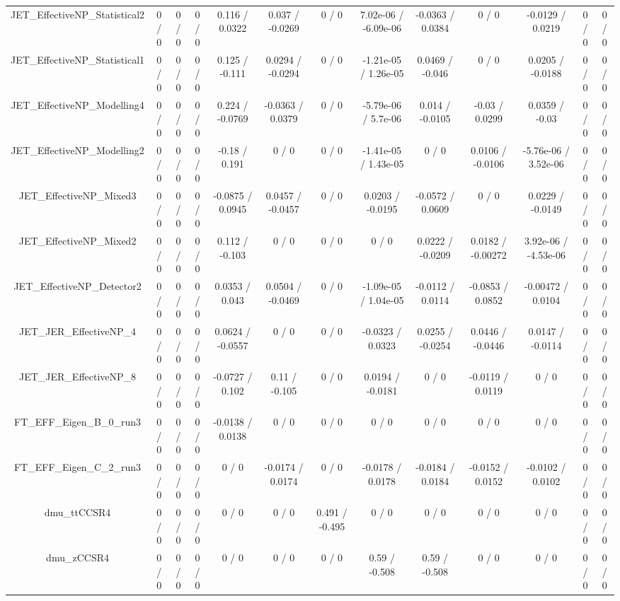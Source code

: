 \documentclass[10pt]{article}
\begin{document}
\begin{table}[htbp]
\begin{center}
\begin{tabular}{|c|c|c|c|c|c|c|c|c|c|c|c|c|}
  JET_EffectiveNP_Statistical2 & 0 / 0 & 0 / 0 & 0 / 0 & 0.116 / 0.0322 & 0.037 / -0.0269 & 0 / 0 & 7.02e-06 / -6.09e-06 & -0.0363 / 0.0384 & 0 / 0 & -0.0129 / 0.0219 & 0 / 0 & 0 / 0 \\ 
  JET_EffectiveNP_Statistical1 & 0 / 0 & 0 / 0 & 0 / 0 & 0.125 / -0.111 & 0.0294 / -0.0294 & 0 / 0 & -1.21e-05 / 1.26e-05 & 0.0469 / -0.046 & 0 / 0 & 0.0205 / -0.0188 & 0 / 0 & 0 / 0 \\ 
  JET_EffectiveNP_Modelling4 & 0 / 0 & 0 / 0 & 0 / 0 & 0.224 / -0.0769 & -0.0363 / 0.0379 & 0 / 0 & -5.79e-06 / 5.7e-06 & 0.014 / -0.0105 & -0.03 / 0.0299 & 0.0359 / -0.03 & 0 / 0 & 0 / 0 \\ 
  JET_EffectiveNP_Modelling2 & 0 / 0 & 0 / 0 & 0 / 0 & -0.18 / 0.191 & 0 / 0 & 0 / 0 & -1.41e-05 / 1.43e-05 & 0 / 0 & 0.0106 / -0.0106 & -5.76e-06 / 3.52e-06 & 0 / 0 & 0 / 0 \\ 
  JET_EffectiveNP_Mixed3 & 0 / 0 & 0 / 0 & 0 / 0 & -0.0875 / 0.0945 & 0.0457 / -0.0457 & 0 / 0 & 0.0203 / -0.0195 & -0.0572 / 0.0609 & 0 / 0 & 0.0229 / -0.0149 & 0 / 0 & 0 / 0 \\ 
  JET_EffectiveNP_Mixed2 & 0 / 0 & 0 / 0 & 0 / 0 & 0.112 / -0.103 & 0 / 0 & 0 / 0 & 0 / 0 & 0.0222 / -0.0209 & 0.0182 / -0.00272 & 3.92e-06 / -4.53e-06 & 0 / 0 & 0 / 0 \\ 
  JET_EffectiveNP_Detector2 & 0 / 0 & 0 / 0 & 0 / 0 & 0.0353 / 0.043 & 0.0504 / -0.0469 & 0 / 0 & -1.09e-05 / 1.04e-05 & -0.0112 / 0.0114 & -0.0853 / 0.0852 & -0.00472 / 0.0104 & 0 / 0 & 0 / 0 \\ 
  JET_JER_EffectiveNP_4 & 0 / 0 & 0 / 0 & 0 / 0 & 0.0624 / -0.0557 & 0 / 0 & 0 / 0 & -0.0323 / 0.0323 & 0.0255 / -0.0254 & 0.0446 / -0.0446 & 0.0147 / -0.0114 & 0 / 0 & 0 / 0 \\ 
  JET_JER_EffectiveNP_8 & 0 / 0 & 0 / 0 & 0 / 0 & -0.0727 / 0.102 & 0.11 / -0.105 & 0 / 0 & 0.0194 / -0.0181 & 0 / 0 & -0.0119 / 0.0119 & 0 / 0 & 0 / 0 & 0 / 0 \\ 
  FT_EFF_Eigen_B_0_run3 & 0 / 0 & 0 / 0 & 0 / 0 & -0.0138 / 0.0138 & 0 / 0 & 0 / 0 & 0 / 0 & 0 / 0 & 0 / 0 & 0 / 0 & 0 / 0 & 0 / 0 \\ 
  FT_EFF_Eigen_C_2_run3 & 0 / 0 & 0 / 0 & 0 / 0 & 0 / 0 & -0.0174 / 0.0174 & 0 / 0 & -0.0178 / 0.0178 & -0.0184 / 0.0184 & -0.0152 / 0.0152 & -0.0102 / 0.0102 & 0 / 0 & 0 / 0 \\ 
  dmu_ttCCSR4 & 0 / 0 & 0 / 0 & 0 / 0 & 0 / 0 & 0 / 0 & 0.491 / -0.495 & 0 / 0 & 0 / 0 & 0 / 0 & 0 / 0 & 0 / 0 & 0 / 0 \\ 
  dmu_zCCSR4 & 0 / 0 & 0 / 0 & 0 / 0 & 0 / 0 & 0 / 0 & 0 / 0 & 0.59 / -0.508 & 0.59 / -0.508 & 0 / 0 & 0 / 0 & 0 / 0 & 0 / 0 \\ 

\end{tabular}
\end{center}
\end{table}
\end{document}

